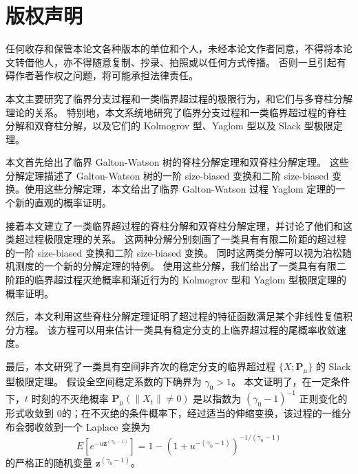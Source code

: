 \documentclass[UTF8]{pkuthss}
\theoremstyle{plain}
\theoremstyle{definition}
\numberwithin{equation}{section}
\begin{document}
\frontmatter
\pagestyle{empty}
\maketitle
\cleardoublepage
\chapter*{版权声明}
\thispagestyle{empty}
	任何收存和保管本论文各种版本的单位和个人，未经本论文作者同意，不得将本论文转借他人，亦不得随意复制、抄录、拍照或以任何方式传播。
	否则一旦引起有碍作者著作权之问题，将可能承担法律责任。
\cleardoublepage
\pagestyle{plain}
\setcounter{page}{0}
\begin{cabstract}
	本文主要研究了临界分支过程和一类临界超过程的极限行为，和它们与多脊柱分解理论的关系。
	特别地，本文系统地研究了临界分支过程和一类临界超过程的脊柱分解和双脊柱分解，以及它们的 Kolmogrov 型、Yaglom 型以及 Slack 型极限定理。

	本文首先给出了临界 Galton-Watson 树的脊柱分解定理和双脊柱分解定理。
	这些分解定理描述了 Galton-Watson 树的一阶 size-biased 变换和二阶 size-biased 变换。使用这些分解定理，本文给出了临界 Galton-Watson 过程 Yaglom 定理的一个新的直观的概率证明。
	
	接着本文建立了一类临界超过程的脊柱分解和双脊柱分解定理，并讨论了他们和这类超过程极限定理的关系。
	这两种分解分别刻画了一类具有有限二阶距的超过程的一阶 size-biased 变换和二阶 size-biased 变换。
	同时这两类分解可以视为泊松随机测度的一个新的分解定理的特例。
	使用这些分解，我们给出了一类具有有限二阶距的临界超过程灭绝概率和渐近行为的 Kolmogrov 型和 Yaglom 型极限定理的概率证明。
	
	然后，本文利用这些脊柱分解定理证明了超过程的特征函数满足某个非线性复值积分方程。
	该方程可以用来估计一类具有稳定分支的上临界超过程的尾概率收敛速度。
	
	最后，本文研究了一类具有空间非齐次的稳定分支的临界超过程 $\{X;\mathbf P_\mu\}$ 的 Slack 型极限定理。
	假设全空间稳定系数的下确界为 $\gamma_0 > 1$。
	本文证明了，在一定条件下，$t$ 时刻的不灭绝概率 $\mathbf P_{\mu}(\|X_t\|\neq 0)$ 是以指数为 $(\gamma_0-1)^{-1}$ 正则变化的形式收敛到 $0$的；在不灭绝的条件概率下，经过适当的伸缩变换，该过程的一维分布会弱收敛到一个 Laplace 变换为
\[
	E[e^{-u\mathbf z^{(\gamma_0-1)}}]=1-(1+u^{-(\gamma_0-1)})^{-1/(\gamma_0-1)}
\]
	的严格正的随机变量 $\mathbf z^{(\gamma_0-1)}$。
\end{cabstract}
\end{document}
